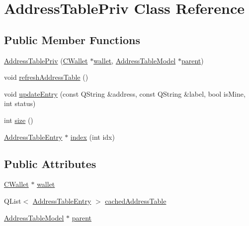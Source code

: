 \hypertarget{class_address_table_priv}{}\section{Address\+Table\+Priv Class Reference}
\label{class_address_table_priv}
\subsection*{Public Member Functions}
\begin{DoxyCompactItemize}
\item 
\hyperlink{class_address_table_priv_aebe853ef4b33ca8efbca40a7be59d139}{Address\+Table\+Priv} (\hyperlink{class_c_wallet}{C\+Wallet} $\ast$\hyperlink{class_address_table_priv_ad3506d642e5546251e76fbf0d75b2aca}{wallet}, \hyperlink{class_address_table_model}{Address\+Table\+Model} $\ast$\hyperlink{class_address_table_priv_ab0b98e86cab673315860630eafbd6561}{parent})
\item 
void \hyperlink{class_address_table_priv_af093c98444e8f734e08cfc2ce5b9b116}{refresh\+Address\+Table} ()
\item 
void \hyperlink{class_address_table_priv_aa0e92b8a58f68606b0fbb7faf04bda44}{update\+Entry} (const Q\+String \&address, const Q\+String \&label, bool is\+Mine, int status)
\item 
int \hyperlink{class_address_table_priv_a4f6133b3bf57ecb5a238698e27a2eb8d}{size} ()
\item 
\hyperlink{struct_address_table_entry}{Address\+Table\+Entry} $\ast$ \hyperlink{class_address_table_priv_af311eb7d0189a74a508d7ad0f563f307}{index} (int idx)
\end{DoxyCompactItemize}
\subsection*{Public Attributes}
\begin{DoxyCompactItemize}
\item 
\hyperlink{class_c_wallet}{C\+Wallet} $\ast$ \hyperlink{class_address_table_priv_ad3506d642e5546251e76fbf0d75b2aca}{wallet}
\item 
Q\+List$<$ \hyperlink{struct_address_table_entry}{Address\+Table\+Entry} $>$ \hyperlink{class_address_table_priv_a0ef3118dd421927db0ba41e2a27c40c7}{cached\+Address\+Table}
\item 
\hyperlink{class_address_table_model}{Address\+Table\+Model} $\ast$ \hyperlink{class_address_table_priv_ab0b98e86cab673315860630eafbd6561}{parent}
\end{DoxyCompactItemize}


